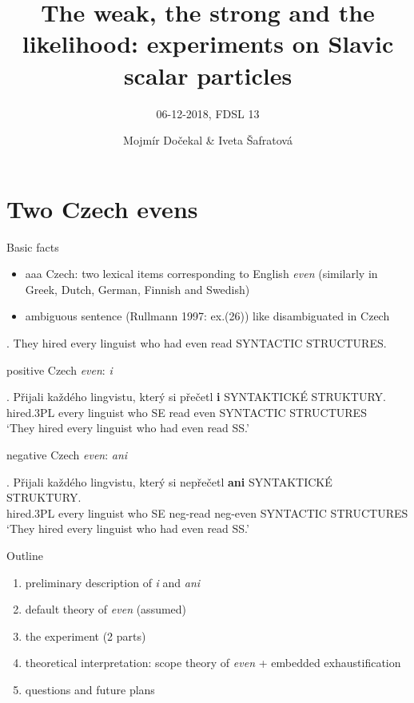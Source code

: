 \documentclass[ignorenonframetext,]{beamer}
\title{The	weak,	the	strong	and	the	
likelihood:	experiments	on	Slavic	
scalar	particles}
\subtitle{06-12-2018, FDSL 13}
\author{Mojmír Dočekal \& Iveta Šafratová}
\date{}
\providecommand{\tightlist}{%
  \setlength{\itemsep}{0pt}\setlength{\parskip}{0pt}}
\begin{document}
\frame{\titlepage}

\section{Two Czech evens}\label{two-czech-evens}

\begin{frame}{Basic facts}

\begin{itemize}
\tightlist
\item aaa Czech: two lexical items corresponding to English \emph{even}
  (similarly in Greek, Dutch, German, Finnish and Swedish)
\item
  ambiguous sentence (Rullmann 1997: ex.(26)) like \Next disambiguated
  in Czech
\end{itemize}

\ex. They hired every linguist who had even read SYNTACTIC STRUCTURES.

\end{frame}

\begin{frame}

positive Czech \emph{even}: \emph{i}

\exg. Přijali každého lingvistu, který si přečetl \textbf{i} SYNTAKTICKÉ
STRUKTURY.\\
hired.3PL every linguist who SE read even SYNTACTIC STRUCTURES\\
`They hired every linguist who had even read SS.'

negative Czech \emph{even}: \emph{ani}

\exg. Přijali každého lingvistu, který si nepřečetl \textbf{ani}
SYNTAKTICKÉ STRUKTURY.\\
hired.3PL every linguist who SE neg-read neg-even SYNTACTIC STRUCTURES\\
`They hired every linguist who had even read SS.'

\end{frame}


\begin{frame}{Outline}

\begin{enumerate}
\def\labelenumi{\arabic{enumi})}
\tightlist
\item
  preliminary description of \emph{i} and \emph{ani}
\item
  default theory of \emph{even} (assumed)
\item
  the experiment (2 parts)
\item
  theoretical interpretation: scope theory of \emph{even} + embedded
  exhaustification
\item
  questions and future plans
\end{enumerate}

\end{frame}
\end{document}
